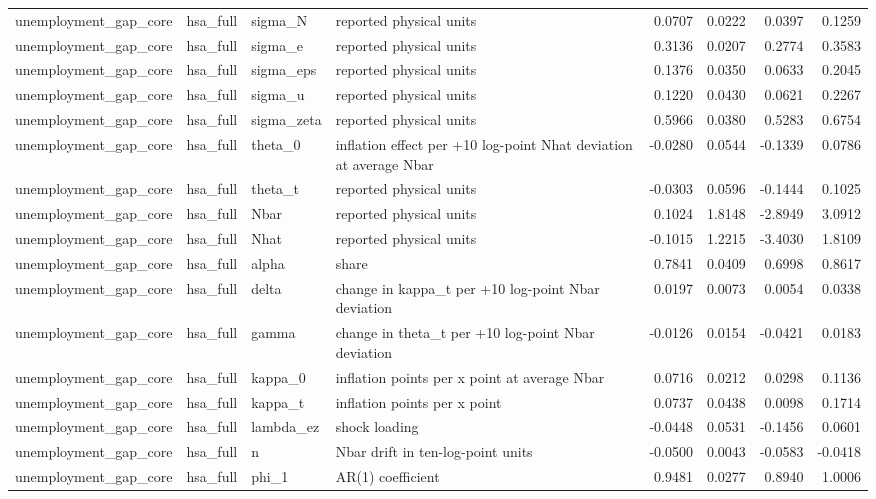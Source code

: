 \begin{tabular}{llllrrrr}
unemployment\_gap\_core & hsa\_full & sigma\_N & reported physical units & 0.0707 & 0.0222 & 0.0397 & 0.1259 \\
unemployment\_gap\_core & hsa\_full & sigma\_e & reported physical units & 0.3136 & 0.0207 & 0.2774 & 0.3583 \\
unemployment\_gap\_core & hsa\_full & sigma\_eps & reported physical units & 0.1376 & 0.0350 & 0.0633 & 0.2045 \\
unemployment\_gap\_core & hsa\_full & sigma\_u & reported physical units & 0.1220 & 0.0430 & 0.0621 & 0.2267 \\
unemployment\_gap\_core & hsa\_full & sigma\_zeta & reported physical units & 0.5966 & 0.0380 & 0.5283 & 0.6754 \\
unemployment\_gap\_core & hsa\_full & theta\_0 & inflation effect per +10 log-point Nhat deviation at average Nbar & -0.0280 & 0.0544 & -0.1339 & 0.0786 \\
unemployment\_gap\_core & hsa\_full & theta\_t & reported physical units & -0.0303 & 0.0596 & -0.1444 & 0.1025 \\
unemployment\_gap\_core & hsa\_full & Nbar & reported physical units & 0.1024 & 1.8148 & -2.8949 & 3.0912 \\
unemployment\_gap\_core & hsa\_full & Nhat & reported physical units & -0.1015 & 1.2215 & -3.4030 & 1.8109 \\
unemployment\_gap\_core & hsa\_full & alpha & share & 0.7841 & 0.0409 & 0.6998 & 0.8617 \\
unemployment\_gap\_core & hsa\_full & delta & change in kappa\_t per +10 log-point Nbar deviation & 0.0197 & 0.0073 & 0.0054 & 0.0338 \\
unemployment\_gap\_core & hsa\_full & gamma & change in theta\_t per +10 log-point Nbar deviation & -0.0126 & 0.0154 & -0.0421 & 0.0183 \\
unemployment\_gap\_core & hsa\_full & kappa\_0 & inflation points per x point at average Nbar & 0.0716 & 0.0212 & 0.0298 & 0.1136 \\
unemployment\_gap\_core & hsa\_full & kappa\_t & inflation points per x point & 0.0737 & 0.0438 & 0.0098 & 0.1714 \\
unemployment\_gap\_core & hsa\_full & lambda\_ez & shock loading & -0.0448 & 0.0531 & -0.1456 & 0.0601 \\
unemployment\_gap\_core & hsa\_full & n & Nbar drift in ten-log-point units & -0.0500 & 0.0043 & -0.0583 & -0.0418 \\
unemployment\_gap\_core & hsa\_full & phi\_1 & AR(1) coefficient & 0.9481 & 0.0277 & 0.8940 & 1.0006 \\

\end{tabular}
